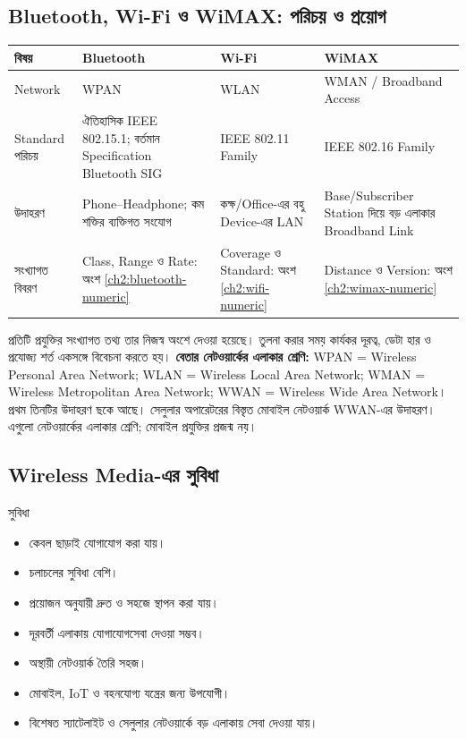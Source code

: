 \subsection{Bluetooth, Wi-Fi ও WiMAX: পরিচয় ও প্রয়োগ}
\begin{tabularx}{\linewidth}{|p{.18\linewidth}|X|X|X|}
\hline
\textbf{বিষয়} & \textbf{Bluetooth} & \textbf{Wi-Fi} & \textbf{WiMAX}\\\hline
Network & WPAN & WLAN & WMAN / Broadband Access\\\hline
Standard পরিচয় & ঐতিহাসিক IEEE 802.15.1; বর্তমান Specification Bluetooth SIG & IEEE 802.11 Family & IEEE 802.16 Family\\\hline
উদাহরণ & Phone–Headphone; কম শক্তির ব্যক্তিগত সংযোগ & কক্ষ/Office-এর বহু Device-এর LAN & Base/Subscriber Station দিয়ে বড় এলাকার Broadband Link\\\hline
সংখ্যাগত বিবরণ & Class, Range ও Rate: অংশ \ref{ch2:bluetooth-numeric} & Coverage ও Standard: অংশ \ref{ch2:wifi-numeric} & Distance ও Version: অংশ \ref{ch2:wimax-numeric}\\\hline
\end{tabularx}
প্রতিটি প্রযুক্তির সংখ্যাগত তথ্য তার নিজস্ব অংশে দেওয়া হয়েছে। তুলনা করার সময় কার্যকর দূরত্ব, ডেটা হার ও প্রযোজ্য শর্ত একসঙ্গে বিবেচনা করতে হয়।
\textbf{বেতার নেটওয়ার্কের এলাকার শ্রেণি:} WPAN = Wireless Personal Area Network; WLAN = Wireless Local Area Network; WMAN = Wireless Metropolitan Area Network; WWAN = Wireless Wide Area Network। প্রথম তিনটির উদাহরণ ছকে আছে। সেলুলার অপারেটরের বিস্তৃত মোবাইল নেটওয়ার্ক WWAN-এর উদাহরণ। এগুলো নেটওয়ার্কের এলাকার শ্রেণি; মোবাইল প্রযুক্তির প্রজন্ম নয়।

\subsection{Wireless Media-এর সুবিধা}

\begin{keypointbox}{সুবিধা}
\begin{itemize}
\item কেবল ছাড়াই যোগাযোগ করা যায়।
\item চলাচলের সুবিধা বেশি।
\item প্রয়োজন অনুযায়ী দ্রুত ও সহজে স্থাপন করা যায়।
\item দূরবর্তী এলাকায় যোগাযোগসেবা দেওয়া সম্ভব।
\item অস্থায়ী নেটওয়ার্ক তৈরি সহজ।
\item মোবাইল, IoT ও বহনযোগ্য যন্ত্রের জন্য উপযোগী।
\item বিশেষত স্যাটেলাইট ও সেলুলার নেটওয়ার্কে বড় এলাকায় সেবা দেওয়া যায়।
\end{itemize}
\end{keypointbox}

